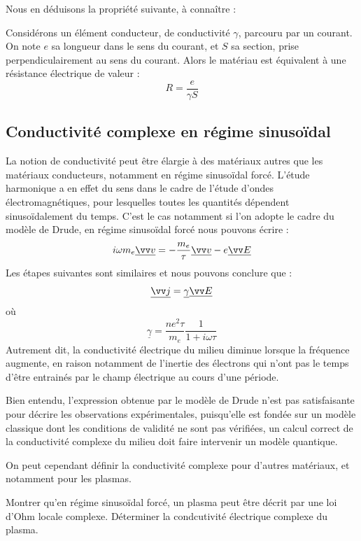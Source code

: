 \documentclass[11pt,fleqn]{book} %
\begin{document}
Nous en déduisons la propriété suivante, à connaître :
\begin{proposition}
	Considérons un élément conducteur, de conductivité $\gamma$, parcouru par un courant. On note $e$ sa longueur dans le sens du courant, et $S$ sa section, prise perpendiculairement au sens du courant. Alors le matériau est équivalent à une résistance électrique de valeur :
	\begin{equation}
		R = \frac{e}{\gamma S}
	\end{equation}
\end{proposition}

\subsection{Conductivité complexe en régime sinusoïdal}

La notion de conductivité peut être élargie à des matériaux autres que les matériaux conducteurs, notamment en régime sinusoïdal forcé. L'étude harmonique a en effet du sens dans le cadre de l'étude d'ondes électromagnétiques, pour lesquelles toutes les quantités dépendent sinusoïdalement du temps. C'est le cas notamment si l'on adopte le cadre du modèle de Drude, en régime sinusoïdal forcé nous pouvons écrire :
\begin{equation}
	i \omega m_e \underline{\vv v} = - \frac{m_e}{\tau} \underline{\vv v} - e \underline{\vv E}
\end{equation}
Les étapes suivantes sont similaires et nous pouvons conclure que :
\begin{equation}
	\underline{\vv j} = \underline{\gamma} \underline{\vv E}
\end{equation}
où
\begin{equation}
	\underline{\gamma} = \frac{n e^2 \tau}{m_e} \frac{1}{1 + i \omega \tau}
\end{equation}
Autrement dit, la conductivité électrique du milieu diminue lorsque la fréquence augmente, en raison notamment de l'inertie des électrons qui n'ont pas le temps d'être entrainés par le champ électrique au cours d'une période.

Bien entendu, l'expression obtenue par le modèle de Drude n'est pas satisfaisante pour décrire les observations expérimentales, puisqu'elle est fondée sur un modèle classique dont les conditions de validité ne sont pas vérifiées, un calcul correct de la conductivité complexe du milieu doit faire intervenir un modèle quantique.

On peut cependant définir la conductivité complexe pour d'autres matériaux, et notamment pour les plasmas.
\begin{capex}
	Montrer qu'en régime sinusoïdal forcé, un plasma peut être décrit par une loi d'Ohm locale complexe. Déterminer la condcutivité électrique complexe du plasma.
\end{capex}
\end{document}
